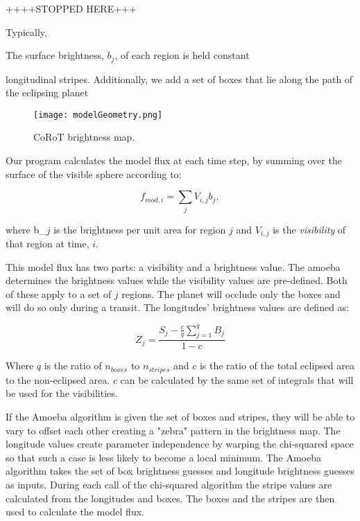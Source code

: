 \documentclass[iop]{emulateapj}
\newcommand{\fmod}{\mbox{$f_{mod,i}$}}
\begin{document}
++++STOPPED HERE+++

Typically, 



The surface brightness, $b_j$, of
each region is held constant 

longitudinal stripes. Additionally, we add a set of boxes that lie along the path of the eclipsing planet

\begin{figure}[h]
	\centering
	\texttt{[image: modelGeometry.png]}
	\caption{CoRoT brightness map.}
	\label{CoRoT}
\end{figure}


Our program calculates the model flux at each time step, by summing over the surface of the visible sphere according to:

\begin{equation}
	\fmod = \sum_j V_{i,j}b_j, 
\end{equation}

where b_$j$ is the brightness per unit area for region $j$ and $V_{i,j}$ is the {\it visibility} of that region at time, $i$.


This model flux has two parts: a visibility and a brightness value. The amoeba determines the brightness values while the visibility values are pre-defined. Both of these apply to a set of $j$ regions. 
The planet will occlude only the boxes and will do so only during a transit. The longitudes' brightness values are defined as:

\begin{equation}
Z_j = \frac{S_j - \frac{c}{q} \sum_{j=1}^{q}B_j}{1- c}
\end{equation}

Where $q$ is the ratio of $n_{boxes}$ to $n_{stripes}$ and $c$ is the ratio of the total eclipsed area to the non-eclipsed area. $c$ can be calculated by the same set of integrals that will be used for the visibilities.

If the Amoeba algorithm is given the set of boxes and stripes, they will be able to vary to offset each other creating a "zebra" pattern in the brightness map.  The longitude values create parameter independence by warping the chi-squared space so that such a case is less likely to become a local minimum. The Amoeba algorithm takes the set of box brightness guesses and longitude brightness guesses as inputs. During each call of the chi-squared algorithm the stripe values are calculated from the longitudes and boxes. The boxes and the stripes are then used to calculate the model flux.
\end{document}
